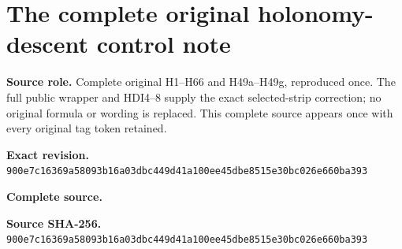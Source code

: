 \begingroup
\sloppy
\small
\makeatletter
\let\EndpointOriginalTagForm\tagform@
\def\tagform@#1{\EndpointOriginalTagForm{Holonomy\, #1}}
\makeatother
\section{The complete original holonomy-descent control note}
\noindent\textbf{Source role.} Complete original H1--H66 and H49a--H49g, reproduced once. The full public wrapper and HDI4--8 supply the exact selected-strip correction; no original formula or wording is replaced. This complete source appears once with every original tag token retained.\par
\noindent\textbf{Exact revision.} \nolinkurl{900e7c16369a58093b16a03dbc449d41a100ee45dbe8515e30bc026e660ba393}\par
\noindent\textbf{Complete source.} \par
\noindent\textbf{Source SHA-256.} \nolinkurl{900e7c16369a58093b16a03dbc449d41a100ee45dbe8515e30bc026e660ba393}\par\medskip

\endgroup
